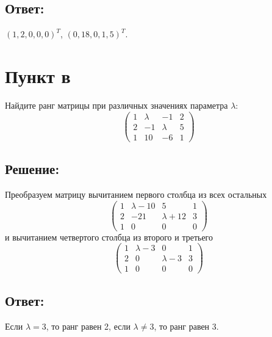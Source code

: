 \documentclass[12pt]{article}
\begin{document}
    \subsection*{Ответ:}
    $\left ( 1, 2, 0, 0, 0 \right )^T$, $\left ( 0, 18, 0, 1, 5 \right )^T$.

    \section*{Пункт в}
    Найдите ранг матрицы при различных значениях параметра $\lambda$:
    \[
        \begin{pmatrix}
            1 & \lambda & -1      & 2 \\
            2 & -1      & \lambda & 5 \\
            1 & 10      & -6      & 1
        \end{pmatrix}
    \]

    \subsection*{Решение:}
    Преобразуем матрицу вычитанием первого столбца из всех остальных
    \[
        \begin{pmatrix}
            1 & \lambda - 10 & 5            & 1 \\
            2 & -21          & \lambda + 12 & 3 \\
            1 & 0            & 0            & 0
        \end{pmatrix}
    \]
    и вычитанием четвертого столбца из второго и третьего
    \[
        \begin{pmatrix}
            1 & \lambda - 3 & 0           & 1 \\
            2 & 0           & \lambda - 3 & 3 \\
            1 & 0           & 0           & 0
        \end{pmatrix}
    \]

    \subsection*{Ответ:}
    Если $\lambda = 3$, то ранг равен 2, если $\lambda \neq 3$, то ранг равен 3.
\end{document}
